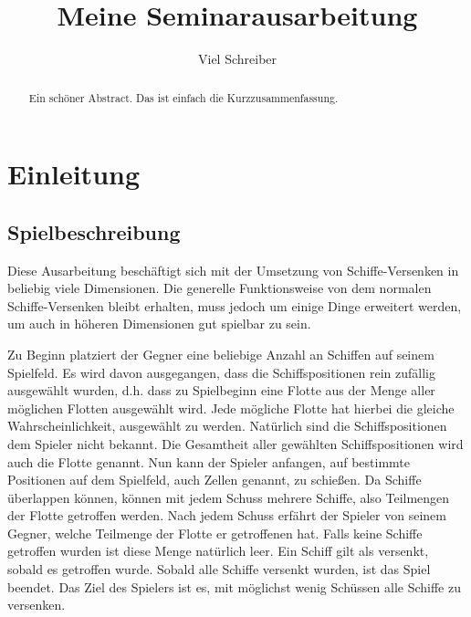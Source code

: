 \documentclass[a4paper,12pt]{llncs}
\numberwithin{equation}{section}
\begin{document}

\author{Viel Schreiber}

\title{Meine Seminarausarbeitung}

\maketitle


\thispagestyle{empty}

\begin{abstract}
Ein schöner Abstract. Das ist einfach die Kurzzusammenfassung.
\end{abstract}

\section{Einleitung}

\subsection{Spielbeschreibung}
\nocite{WB95} %
Diese Ausarbeitung beschäftigt sich mit der Umsetzung von Schiffe-Versenken in beliebig viele Dimensionen.
Die generelle Funktionsweise von dem normalen Schiffe-Versenken bleibt erhalten, muss jedoch um einige Dinge erweitert werden, um auch in höheren Dimensionen gut spielbar zu sein.

Zu Beginn platziert der Gegner eine beliebige Anzahl an Schiffen auf seinem Spielfeld. Es wird davon ausgegangen, dass die Schiffspositionen rein zufällig ausgewählt wurden, d.h. dass zu Spielbeginn eine Flotte aus der Menge aller möglichen Flotten ausgewählt wird. Jede mögliche Flotte hat hierbei die gleiche Wahrscheinlichkeit, ausgewählt zu werden.
Natürlich sind die Schiffspositionen dem Spieler nicht bekannt.
Die Gesamtheit aller gewählten Schiffspositionen wird auch die Flotte genannt.
Nun kann der Spieler anfangen, auf bestimmte Positionen auf dem Spielfeld, auch Zellen genannt, zu schießen.
Da Schiffe überlappen können, können mit jedem Schuss mehrere Schiffe, also Teilmengen der Flotte getroffen werden.
Nach jedem Schuss erfährt der Spieler von seinem Gegner, welche Teilmenge der Flotte er getroffenen hat.
Falls keine Schiffe getroffen wurden ist diese Menge natürlich leer.
Ein Schiff gilt als versenkt, sobald es getroffen wurde.
Sobald alle Schiffe versenkt wurden, ist das Spiel beendet.
Das Ziel des Spielers ist es, mit möglichst wenig Schüssen alle Schiffe zu versenken.
\end{document}

